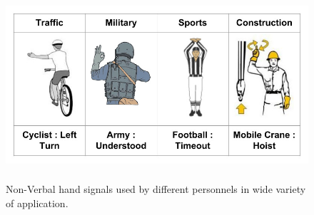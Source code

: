 \begin{figure}
	[h] \centering 
	\includegraphics[height=7cm]{figures/content/ges-signals.jpg} \caption{Non-Verbal hand signals used by different personnels in wide variety of application. \cite{22} } \label{fg:ges:signal} 
\end{figure}

